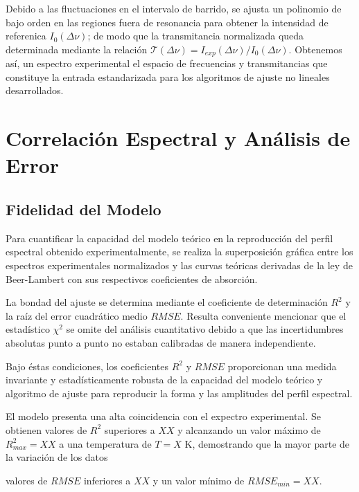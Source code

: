 Debido a las fluctuaciones en el intervalo de barrido, se ajusta un polinomio de bajo orden en las regiones fuera de resonancia para obtener la intensidad de referenica $I_0(\Delta \nu)$; de modo que la transmitancia normalizada queda determinada mediante la relación $\mathscr{T}(\Delta \nu) = I_{exp}(\Delta \nu)/ I_0(\Delta  \nu )$. Obtenemos así, un espectro experimental el espacio de frecuencias y transmitancias que constituye la entrada estandarizada para los algoritmos de ajuste no lineales desarrollados.

\section{Correlación Espectral y Análisis de Error}
\subsection{Fidelidad del Modelo}
Para cuantificar la capacidad del modelo teórico en la reproducción del perfil espectral obtenido experimentalmente, se realiza la superposición gráfica entre los espectros experimentales normalizados y las curvas teóricas derivadas de la ley de Beer-Lambert con sus respectivos coeficientes de absorción.

La bondad del ajuste se determina mediante el coeficiente de determinación $R^2$ y la raíz del error cuadrático medio $RMSE$. Resulta conveniente mencionar que el estadístico $\chi^2$ se omite del análisis cuantitativo debido a que las incertidumbres absolutas punto a punto no estaban calibradas de manera independiente.

Bajo éstas condiciones, los coeficientes $R^2$ y $RMSE$ proporcionan una medida invariante y estadísticamente robusta de la capacidad del modelo teórico y algoritmo de ajuste para reproducir la forma y las amplitudes del perfil espectral. 

El modelo presenta una alta coincidencia con el expectro experimental. 
Se obtienen valores de $R^2$ superiores a $XX$ y alcanzando un valor máximo de $R^2_{max} = XX$ a una temperatura de $T = X \text{ K}$, demostrando que la mayor parte de la variación de los datos 

valores de $RMSE$ inferiores a $XX$ y un valor mínimo de $RMSE_{min} = XX$. 

